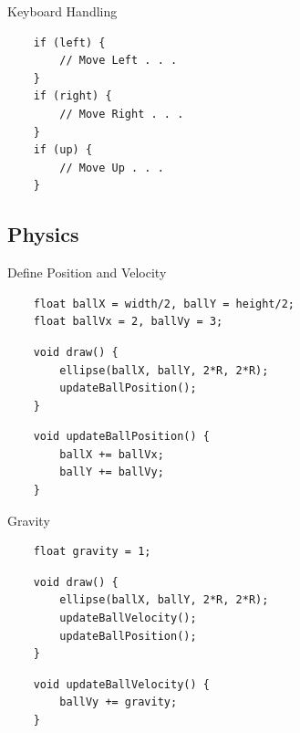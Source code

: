 \begin{frame}[fragile]{Keyboard Handling}{}
    \huge
    \begin{verbatim}
    if (left) {
        // Move Left . . .
    }
    if (right) {
        // Move Right . . .
    }
    if (up) {
        // Move Up . . .
    }
    \end{verbatim}
\end{frame}

\subsection{Physics}
\begin{frame}[fragile]{Define Position and Velocity}{}
    \Large
    \begin{verbatim}
    float ballX = width/2, ballY = height/2;
    float ballVx = 2, ballVy = 3;
    \end{verbatim}
    \pause
    \begin{verbatim}
    void draw() {
        ellipse(ballX, ballY, 2*R, 2*R);
        updateBallPosition();
    }
    \end{verbatim}
    \pause
    \begin{verbatim}
    void updateBallPosition() {
        ballX += ballVx;
        ballY += ballVy;
    }
    \end{verbatim}
\end{frame}

\begin{frame}[fragile]{Gravity}{}
    \Large
    \begin{verbatim}
    float gravity = 1;
    \end{verbatim}
    \pause
    \begin{verbatim}
    void draw() {
        ellipse(ballX, ballY, 2*R, 2*R);
        updateBallVelocity();
        updateBallPosition();
    }
    \end{verbatim}
    \pause
    \begin{verbatim}
    void updateBallVelocity() {
        ballVy += gravity;
    }
    \end{verbatim}
\end{frame}


